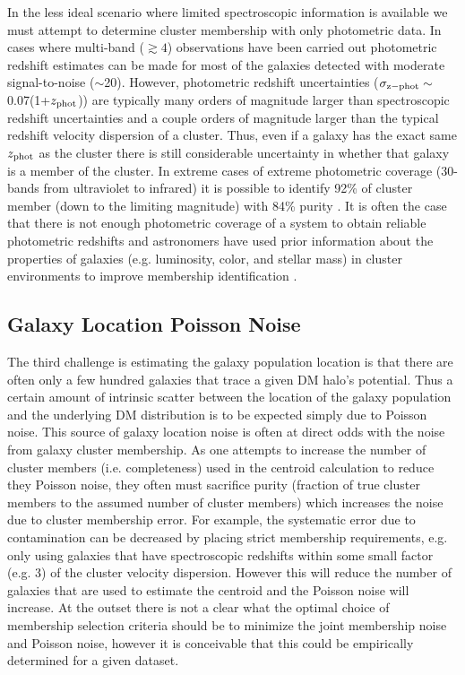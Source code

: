 In the less ideal scenario where limited spectroscopic information is available we must attempt to determine cluster membership with only photometric data.
In cases where multi-band ($\gtrsim 4$) observations have been carried out photometric redshift estimates can be made for most of the galaxies detected with moderate signal-to-noise ($\sim$20).
However, photometric redshift uncertainties ($\sigma_{\rm z-phot}\sim$0.07(1+$z_{\rm phot}$)) are typically many orders of magnitude larger than spectroscopic redshift uncertainties and a couple orders of magnitude larger than the typical redshift velocity dispersion of a cluster.
Thus, even if a galaxy has the exact same $z_{\rm phot}$ as the cluster there is still considerable uncertainty in whether that galaxy is a member of the cluster.
In extreme cases of extreme photometric coverage (30-bands from ultraviolet to infrared) it is possible to identify 92\% of cluster member (down to the limiting magnitude) with 84\% purity \citep{George:2011kv}.
It is often the case that there is not enough photometric coverage of a system to obtain reliable photometric redshifts and astronomers have used prior information about the properties of galaxies (e.g. luminosity, color, and stellar mass)  in cluster environments to improve membership identification \citep[see][for a review]{George:2012uo}. 

\subsection{Galaxy Location Poisson Noise}

The third challenge is estimating the galaxy population location is that there are often only a few hundred galaxies that trace a given DM halo's potential.
Thus a certain amount of intrinsic scatter between the location of the galaxy population and the underlying DM distribution is to be expected simply due to Poisson noise.
This source of galaxy location noise is often at direct odds with the noise from galaxy cluster membership.
As one attempts to increase the number of cluster members (i.e. completeness) used in the centroid calculation to reduce they Poisson noise, they often must sacrifice purity (fraction of true cluster members to the assumed number of cluster members) which increases the noise due to cluster membership error.
For example, the systematic error due to contamination can be decreased by placing strict membership requirements, e.g. only using galaxies that have spectroscopic redshifts within some small factor (e.g. 3) of the cluster velocity dispersion.
However this will reduce the number of galaxies that are used to estimate the centroid and the Poisson noise will increase.
At the outset there is not a clear what the optimal choice of membership selection criteria should be to minimize the joint membership noise and Poisson noise, however it is conceivable that this could be empirically determined for a given dataset.

